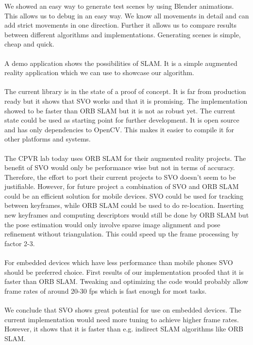 \documentclass[11pt,a4paper,titlepage,oneside]{report}
\begin{document}
We showed an easy way to generate test scenes by using Blender animations. This allows us to debug in an easy way. We know all movements in detail and can add strict movements in one direction. Further it allows us to compare results between different algorithms and implementations. Generating scenes is simple, cheap and quick.\\\\
A demo application shows the possibilities of SLAM. It is a simple augmented reality application which we can use to showcase our algorithm.\\\\
The current library is in the state of a proof of concept. It is far from production ready but it shows that SVO works and that it is promising. The implementation showed to be faster than ORB SLAM but it is not as robust yet. The current state could be used as starting point for further development. It is open source and has only dependencies to OpenCV. This makes it easier to compile it for other platforms and systems.\\\\
The CPVR lab today uses ORB SLAM for their augmented reality projects. The benefit of SVO would only be performance wise but not in terms of accuracy. Therefore, the effort to port their current projects to SVO doesn't seem to be justifiable. However, for future project a combination of SVO and ORB SLAM could be an efficient solution for mobile devices. SVO could be used for tracking between keyframes, while ORB SLAM could be used to do re-location. Inserting new keyframes and computing descriptors would still be done by ORB SLAM but the pose estimation would only involve sparse image alignment and pose refinement without triangulation. This could speed up the frame processing by factor 2-3.\\\\
For embedded devices which have less performance than mobile phones SVO should be preferred choice. First results of our implementation proofed that it is faster than ORB SLAM. Tweaking and optimizing the code would probably allow frame rates of around 20-30 fps which is fast enough for most tasks.\\\\
We conclude that SVO shows great potential for use on embedded devices. The current implementation would need more tuning to achieve higher frame rates. However, it shows that it is faster than e.g. indirect SLAM algorithms like ORB SLAM.

\printbibliography
\end{document}
